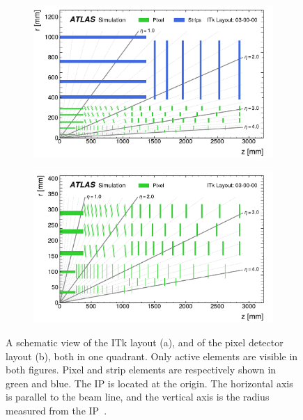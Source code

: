 \begin{figure}[h]
    \begin{subfigure}[b]{0.49\textwidth}
        \centering
        \includegraphics[width=\linewidth]{figures/itk-layout.pdf}
        \caption{}
        \label{subfig:itk-layout}
    \end{subfigure}
    \begin{subfigure}[b]{0.49\textwidth}
        \centering
        \includegraphics[width=\linewidth]{figures/itk-layout-pixel.pdf}
        \caption{}
        \label{subfig:itk-layout-pixel}
    \end{subfigure}
    \caption{A schematic view of the ITk layout (a), and of the pixel detector layout (b), both in one quadrant. Only active elements are visible in both figures. Pixel and strip elements are respectively shown in green and blue. The IP is located at the origin. The horizontal axis is parallel to the beam line, and the vertical axis is the radius measured from the IP~\cite{Aad_2025}.}
    \label{fig:itk-layout}
\end{figure}

